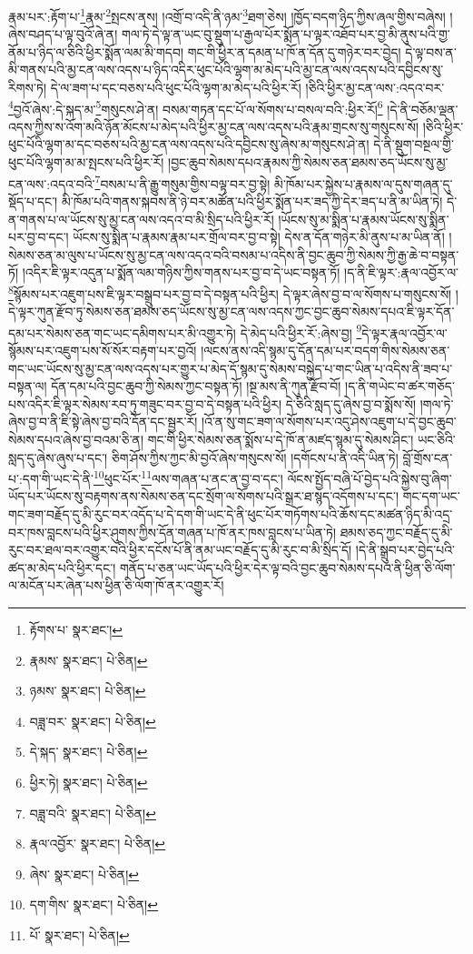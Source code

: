 རྣམ་པར་:རྟོག་པ་\footnote{རྟོགས་པ་  སྣར་ཐང་། }རྣམ་\footnote{རྣམས་  སྣར་ཐང་།  པེ་ཅིན། }སྤངས་ནས། །འགྲོ་བ་འདི་ནི་ཉམ་\footnote{ཉམས་  སྣར་ཐང་།  པེ་ཅིན། }ཐག་ཅེས། །ཁྱོད་བདག་ཉིད་ཀྱིས་ཞལ་གྱིས་བཞེས། །ཞེས་བཤད་པ་ལྟ་བུའོ་ཞེ་ན། གལ་ཏེ་དེ་ལྟ་ན་ཡང་བུ་སྡུག་པ་རྒྱལ་པོར་སྨོན་པ་ལྟར་འཐོབ་པར་བྱ་མི་ནུས་པའི་གྱ་ནོམ་པ་ཉིད་ལ་ཅིའི་ཕྱིར་སྨོན་ལམ་མི་གདབ། གང་གི་ཕྱིར་ན་དམན་པ་ཁོ་ན་དོན་དུ་གཉེར་བར་བྱེད། དེ་ལྟ་བས་ན་མི་གནས་པའི་མྱ་ངན་ལས་འདས་པ་ཉིད་འདིར་ཕུང་པོའི་ལྷག་མ་མེད་པའི་མྱ་ངན་ལས་འདས་པའི་དབྱིངས་སུ་རིགས་ཏེ། དེ་ལ་ཟག་པ་དང་བཅས་པའི་ཕུང་པོའི་ལྷག་མ་མེད་པའི་ཕྱིར་རོ། །ཅིའི་ཕྱིར་མྱ་ངན་ལས་:འདའ་བར་\footnote{བཟླ་བར་  སྣར་ཐང་།  པེ་ཅིན། }བྱའོ་ཞེས་:དེ་སྐད་མ་\footnote{དེ་སྐད་  སྣར་ཐང་།  པེ་ཅིན། }གསུངས་ཤེ་ན། བསམ་གཏན་དང་པོ་ལ་སོགས་པ་བསལ་བའི་:ཕྱིར་རོ།\footnote{ཕྱིར་ཏེ།  སྣར་ཐང་།  པེ་ཅིན། } །དེ་ནི་བཅོམ་ལྡན་འདས་ཀྱིས་ས་འོག་མའི་ཉོན་མོངས་པ་མེད་པའི་ཕྱིར་མྱ་ངན་ལས་འདས་པའི་རྣམ་གྲངས་སུ་གསུངས་སོ། །ཅིའི་ཕྱིར་ཕུང་པོའི་ལྷག་མ་དང་བཅས་པའི་མྱ་ངན་ལས་འདས་པའི་དབྱིངས་སུ་ཞེས་མ་གསུངས་ཤེ་ན། དེ་ནི་སྡུག་བསྔལ་གྱི་ཕུང་པོའི་ལྷག་མ་མ་སྤངས་པའི་ཕྱིར་རོ། །བྱང་ཆུབ་སེམས་དཔའ་རྣམས་ཀྱི་སེམས་ཅན་ཐམས་ཅད་ཡོངས་སུ་མྱ་ངན་ལས་:འདའ་བའི་\footnote{བཟླ་བའི་  སྣར་ཐང་།  པེ་ཅིན། }བསམ་པ་ནི་རྒྱུ་གསུམ་གྱིས་བལྟ་བར་བྱ་སྟེ། མི་ཁོམ་པར་སྐྱེས་པ་རྣམས་ལ་དུས་གཞན་དུ་སྡོད་པ་དང་། མི་ཁོམ་པའི་གནས་སྐབས་ནི་ཉེ་བར་མཚོན་པའི་ཕྱིར་སྨོན་པར་ཟད་ཀྱི་དེར་ཟད་པ་ནི་མ་ཡིན་ཏེ། དེ་ན་གནས་པ་ལ་ཡོངས་སུ་མྱ་ངན་ལས་འདའ་བ་མི་སྲིད་པའི་ཕྱིར་རོ། །ཡོངས་སུ་མ་སྨིན་པ་རྣམས་ཡོངས་སུ་སྨིན་པར་བྱ་བ་དང་། ཡོངས་སུ་སྨིན་པ་རྣམས་རྣམ་པར་གྲོལ་བར་བྱ་བ་སྟེ། དེས་ན་དོན་གཉེར་མི་ནུས་པ་མ་ཡིན་ནོ། །སེམས་ཅན་མ་ལུས་པ་ཡོངས་སུ་མྱ་ངན་ལས་འདའ་བའི་བསམ་པ་འདིས་ནི་བྱང་ཆུབ་ཀྱི་སེམས་ཀྱི་རྒྱ་ཆེ་བ་བསྟན་ཏོ། །འདིར་ཇི་ལྟར་འདུན་པ་སྨོན་ལམ་གཉིས་ཀྱིས་གནས་པར་བྱ་བ་དེ་ཡང་བསྟན་ཏོ། །ད་ནི་ཇི་ལྟར་:རྣལ་འབྱོར་ལ་\footnote{རྣལ་འབྱོར་  སྣར་ཐང་།  པེ་ཅིན། }སྙོམས་པར་འཇུག་པས་ཇི་ལྟར་བསྒྲུབ་པར་བྱ་བ་དེ་བསྟན་པའི་ཕྱིར། དེ་ལྟར་ཞེས་བྱ་བ་ལ་སོགས་པ་གསུངས་སོ། །དེ་ལྟར་ཀུན་རྫོབ་ཏུ་སེམས་ཅན་ཐམས་ཅད་ཡོངས་སུ་མྱ་ངན་ལས་འདས་ཀྱང་བྱང་ཆུབ་སེམས་དཔའ་ཇི་ལྟར་དོན་དམ་པར་སེམས་ཅན་གང་ཡང་དམིགས་པར་མི་འགྱུར་ཏེ། དེ་མེད་པའི་ཕྱིར་རོ་:ཞེས་བྱ། \footnote{ཞེས་  སྣར་ཐང་།  པེ་ཅིན། }དེ་ལྟར་རྣལ་འབྱོར་ལ་སྙོམས་པར་འཇུག་པས་སོ་སོར་བརྟག་པར་བྱའོ། །ལངས་ནས་འདི་སྙམ་དུ་དོན་དམ་པར་བདག་གིས་སེམས་ཅན་གང་ཡང་ཡོངས་སུ་མྱ་ངན་ལས་འདས་པར་གྱུར་པ་མེད་དོ་སྙམ་དུ་སེམས་བསྐྱེད་པ་གང་ཡིན་པ་འདིས་ནི་ཟབ་པ་བསྟན་ལ། དོན་དམ་པའི་བྱང་ཆུབ་ཀྱི་སེམས་ཀྱང་བསྟན་ཏོ། །སྔ་མས་ནི་ཀུན་རྫོབ་བོ། །ད་ནི་གཡེང་བ་ཚར་གཅོད་པས་འདིར་ཇི་ལྟར་སེམས་རབ་ཏུ་གཟུང་བར་བྱ་བ་དེ་བསྟན་པའི་ཕྱིར། དེ་ཅིའི་སླད་དུ་ཞེས་བྱ་བ་སྨོས་སོ། །གལ་ཏེ་ཞེས་བྱ་བ་ནི་ཇི་སྟེ་ཞེས་བྱ་བའི་དོན་དང་སྦྱར་རོ། །འོ་ན་སུ་གང་ཟག་ལ་སོགས་པར་འདུ་ཤེས་འཇུག་པ་དེ་བྱང་ཆུབ་སེམས་དཔའ་ཞེས་བྱ་བའམ་ཅི་ན། གང་གི་ཕྱིར་སེམས་ཅན་སྨོས་པ་དེ་ཁོ་ན་མཛད་སྙམ་དུ་སེམས་ཤིང་། ཡང་ཅིའི་སླད་དུ་ཞེས་ཞུས་པ་དང་། ཅིག་ཤོས་ཀྱིས་ཀྱང་མི་བྱའོ་ཞེས་གསུངས་སོ། །དགོངས་པ་ནི་འདི་ཡིན་ཏེ། བློ་གྲོས་ངན་པ་:དག་གི་ཡང་དེ་ནི་\footnote{དག་གིས་  སྣར་ཐང་།  པེ་ཅིན། }ཕུང་པོར་\footnote{པོ་  སྣར་ཐང་།  པེ་ཅིན། }ལས་གཞན་པ་ནང་ན་བྱ་བ་དང་། ལོངས་སྤྱོད་བཞི་པོ་བྱེད་པའི་སྐྱེས་བུ་ཞིག་ཡོད་པར་ཡོངས་སུ་བརྟགས་ནས་སེམས་ཅན་དང་སྲོག་ལ་སོགས་པའི་སྒྲར་ཐ་སྙད་འདོགས་པ་དང་། གང་དག་ཡང་གང་ཟག་བརྗོད་དུ་མི་རུང་བར་འདོད་པ་དེ་དག་གི་ཡང་དེ་ནི་ཕུང་པོར་གཏོགས་པའི་ཆོས་དང་མཚན་ཉིད་མི་འདྲ་བར་ཁས་བླངས་པའི་ཕྱིར་ཤུགས་ཀྱིས་དོན་གཞན་པ་ཁོ་ནར་ཁས་བླངས་པ་ཡིན་ཏེ། ཐམས་ཅད་ཀྱང་བརྗོད་དུ་མི་རུང་བར་ཐལ་བར་འགྱུར་བའི་ཕྱིར་དངོས་པོ་ནི་ནམ་ཡང་བརྗོད་དུ་མི་རུང་བ་མི་སྲིད་དོ། །དེ་ནི་སྒྲུབ་པར་བྱེད་པའི་ཚད་མ་མེད་པའི་ཕྱིར་དང་། གནོད་པ་ཅན་ཡང་ཡོད་པའི་ཕྱིར་དེར་ལྟ་བའི་བྱང་ཆུབ་སེམས་དཔའ་ནི་ཕྱིན་ཅི་ལོག་ལ་མངོན་པར་ཞེན་པས་ཕྱིན་ཅི་ལོག་ཁོ་ནར་འགྱུར་རོ། 